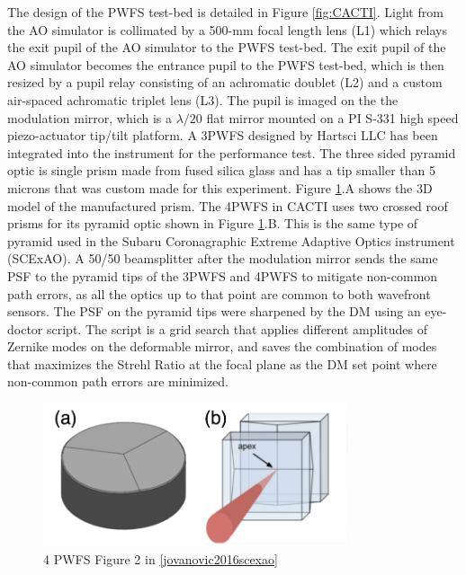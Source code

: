 \documentclass[12pt]{spieman}  %
\begin{document}
\begin{spacing}{2}
The design of the PWFS test-bed is detailed in Figure \ref{fig:CACTI}. Light from the AO simulator is collimated by a 500-mm focal length lens (L1) which relays the exit pupil of the AO simulator to the PWFS test-bed. The exit pupil of the AO simulator becomes the entrance pupil to the PWFS test-bed, which is then resized by a pupil relay consisting of an achromatic doublet (L2) and a custom air-spaced achromatic triplet lens (L3). The pupil is imaged on the the modulation mirror, which is a $\lambda/20$ flat mirror mounted on a PI S-331 high speed piezo-actuator tip/tilt platform. A 3PWFS designed by Hartsci LLC has been integrated into the instrument for the performance test. The three sided pyramid optic is single prism made from fused silica glass and has a tip smaller than 5 microns that was custom made for this experiment. Figure \ref{fig:pyramidOptics}.A shows the 3D model of the manufactured prism. The 4PWFS in CACTI uses two crossed roof prisms\cite{jovanovic2016scexao} for its pyramid optic shown in Figure \ref{fig:pyramidOptics}.B. This is the same type of pyramid used in the Subaru Coronagraphic Extreme Adaptive Optics instrument (SCExAO)\cite{jovanovic2015subaru}.  A 50/50 beamsplitter after the modulation mirror sends the same PSF to the pyramid tips of the 3PWFS and 4PWFS to mitigate non-common path errors, as all the optics up to that point are common to both wavefront sensors. The PSF on the pyramid tips were sharpened by the DM using an eye-doctor script. The script is a grid search that applies different amplitudes of Zernike modes on the deformable mirror, and saves the combination of modes that maximizes the Strehl Ratio at the focal plane as the  DM set point where non-common path errors are minimized.

\begin{figure}
    \centering
    \includegraphics[width=0.8\textwidth]{pyramidOptics.png}
    \caption{4 PWFS Figure 2 in \ref{jovanovic2016scexao}}
    \label{fig:pyramidOptics}
\end{figure}



\end{spacing}
\end{document}
